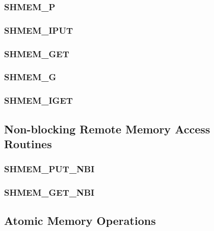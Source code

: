 \documentclass[10pt]{book}
\begin{document}
\subsubsection{\textbf{SHMEM\_P}}\label{subsec:shmem_p}


\subsubsection{\textbf{SHMEM\_IPUT}}\label{subsec:shmem_iput}


\subsubsection{\textbf{SHMEM\_GET}}\label{subsec:shmem_get}


\subsubsection{\textbf{SHMEM\_G}}\label{subsec:shmem_g}


\subsubsection{\textbf{SHMEM\_IGET}}\label{subsec:shmem_iget}


\subsection{Non-blocking Remote Memory Access Routines}\label{sec:rma_nbi}

\subsubsection{\textbf{SHMEM\_PUT\_NBI}}\label{subsec:shmem_put_nbi}


\subsubsection{\textbf{SHMEM\_GET\_NBI}}\label{subsec:shmem_get_nbi}



\subsection{Atomic Memory Operations}\label{sec:amo}

\end{document}
